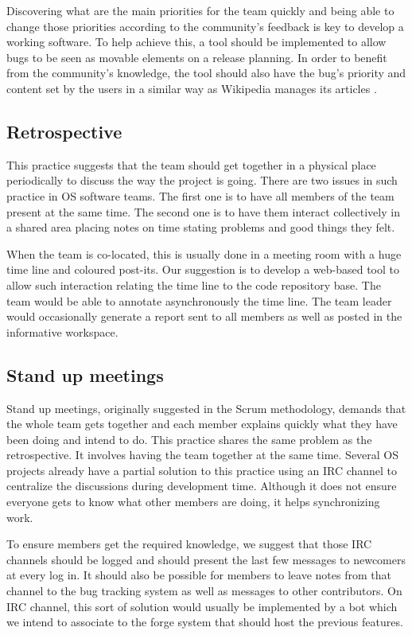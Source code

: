 Discovering what are the main priorities for the team quickly and
being able to change those priorities according to the community's
feedback is key to develop a working software. To help achieve this, a
tool should be implemented to allow bugs to be seen as movable
elements on a release planning. In order to benefit from the
community's knowledge, the tool should also have the bug's priority
and content set by the users in a similar way as Wikipedia manages its
articles \cite{Surowiecki2004,Tapscott2006,Benkler2006}.

\subsection{Retrospective}
\label{subsec:retrospect}

This practice suggests that the team should get together in a physical
place periodically to discuss the way the project is going. There are
two issues in such practice in OS software teams. The first one is to
have all members of the team present at the same time. The second one
is to have them interact collectively in a shared area placing notes
on time stating problems and good things they felt.

When the team is co-located, this is usually done in a meeting room
with a huge time line and coloured post-its. Our suggestion is to
develop a web-based tool to allow such interaction relating the time
line to the code repository base. The team would be able to annotate
asynchronously the time line. The team leader would occasionally
generate a report sent to all members as well as posted in the
informative workspace.

\subsection{Stand up meetings}
\label{subsec:stand-up}

Stand up meetings, originally suggested in the Scrum methodology,
demands that the whole team gets together and each member explains
quickly what they have been doing and intend to do. This practice
shares the same problem as the retrospective. It involves having the
team together at the same time. Several OS projects already have a
partial solution to this practice using an IRC channel to centralize
the discussions during development time. Although it does not ensure
everyone gets to know what other members are doing, it helps
synchronizing work.

To ensure members get the required knowledge, we suggest that those
IRC channels should be logged and should present the last few messages
to newcomers at every log in. It should also be possible for members
to leave notes from that channel to the bug tracking system as well as
messages to other contributors. On IRC channel, this sort of solution
would usually be implemented by a bot which we intend to associate to
the forge system that should host the previous features.
